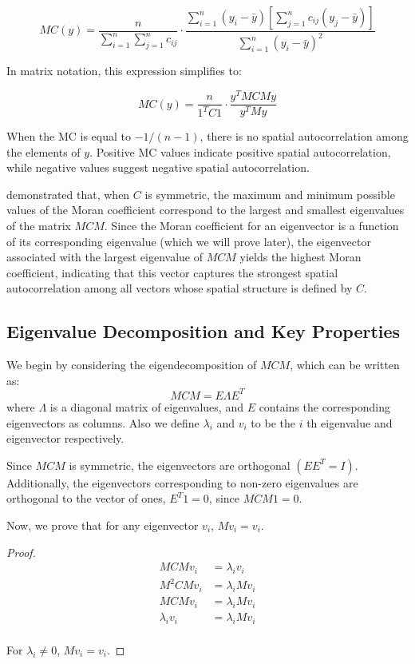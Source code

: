 \documentclass[12pt]{article}
\begin{document}
\[
M C(y) = \frac{n}{\sum_{i=1}^n \sum_{j=1}^n c_{ij}} \cdot \frac{\sum_{i=1}^n \left(y_i - \bar{y} \right) \left[ \sum_{j=1}^n c_{ij} \left( y_j - \bar{y} \right) \right]}{\sum_{i=1}^n \left( y_i - \bar{y} \right)^2}
\]

In matrix notation, this expression simplifies to:

\[
  M C(y) = \frac{n}{1^T C 1} \cdot \frac{y^T M C M y}{y^T M y}
\]

When the MC is equal to \( -1 / (n-1) \), there is no spatial autocorrelation among the elements of \( y \). Positive MC values indicate positive spatial autocorrelation, while negative values suggest negative spatial autocorrelation. 

\citet{de1984extreme} demonstrated that, when \( C \) is symmetric, the maximum and minimum possible values of the Moran coefficient correspond to the largest and smallest eigenvalues of the matrix \( MCM \). Since the Moran coefficient for an eigenvector is a function of its corresponding eigenvalue (which we will prove later), the eigenvector associated with the largest eigenvalue of \( MCM \) yields the highest Moran coefficient, indicating that this vector captures the strongest spatial autocorrelation among all vectors whose spatial structure is defined by \( C \).

\subsection*{Eigenvalue Decomposition and Key Properties}

We begin by considering the eigendecomposition of \( M C M \), which can be written as:
\[
  M C M = E \Lambda E^{T}
\]
where \( \Lambda \) is a diagonal matrix of eigenvalues, and \( E \) contains the corresponding eigenvectors as columns. Also we define \( \lambda_i \) and \( v_i \) to be the \( i \) th eigenvalue and eigenvector respectively.

Since \( M C M \) is symmetric, the eigenvectors are orthogonal \( \left(E E^T = I \right) \). Additionally, the eigenvectors corresponding to non-zero eigenvalues are orthogonal to the vector of ones, \( E^T 1 = 0 \), since \( M C M 1 = 0 \).

Now, we prove that for any eigenvector \( v_i \), \( M v_i = v_i \).

\begin{proof}
  \begin{align*}
    M C M v_i & = \lambda_i v_i \\
    M^2 C M v_i & = \lambda_i M v_i \\
    M C M v_i & = \lambda_i M v_i \\
    \lambda_i v_i & = \lambda_i M v_i \\
  \end{align*}

  For \( \lambda_i \neq 0 \), \( M v_i = v_i \).
\end{proof}
\end{document}
